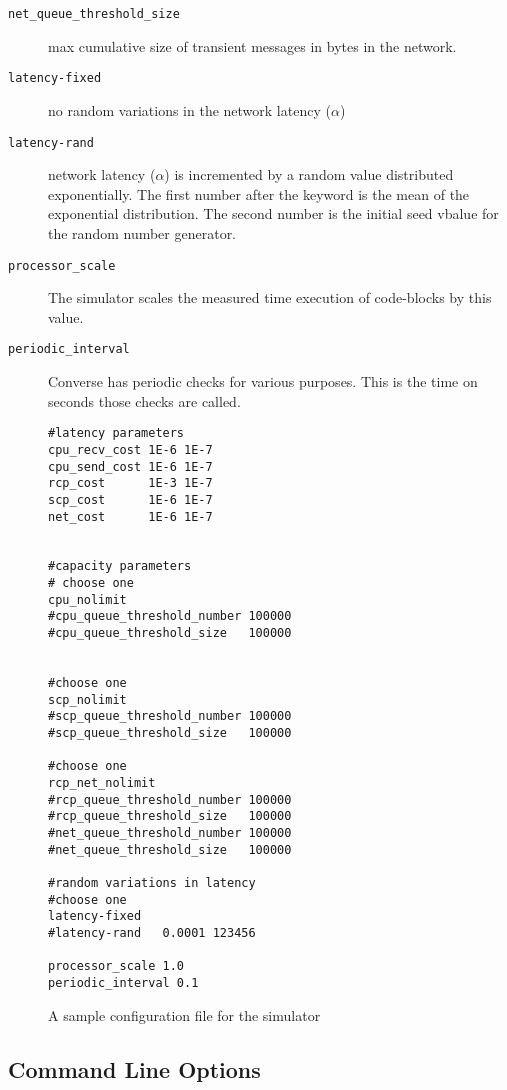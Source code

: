 \begin{description}
\item[{\tt net\_queue\_threshold\_size}] max cumulative size of transient 
                       messages in bytes in the network.

\item[{\tt latency-fixed}] no random variations in the network latency 
                           ($\alpha$)

\item[{\tt latency-rand}] network latency ($\alpha$) is incremented by
                       a random value distributed exponentially. The first
                       number after the keyword is the mean of the
                       exponential distribution. The second number is the
                       initial seed vbalue for the random number generator.


\item[{\tt processor\_scale}] The simulator scales the measured time
                      execution of code-blocks by this value.

\item[{\tt periodic\_interval}] Converse has periodic checks for
                      various purposes. This is the time on seconds
                      those checks are called.
\end{description}


\begin{figure}
\begin{verbatim}
#latency parameters
cpu_recv_cost 1E-6 1E-7              
cpu_send_cost 1E-6 1E-7
rcp_cost      1E-3 1E-7
scp_cost      1E-6 1E-7
net_cost      1E-6 1E-7


#capacity parameters
# choose one 
cpu_nolimit
#cpu_queue_threshold_number 100000
#cpu_queue_threshold_size   100000


#choose one
scp_nolimit
#scp_queue_threshold_number 100000
#scp_queue_threshold_size   100000

#choose one
rcp_net_nolimit
#rcp_queue_threshold_number 100000
#rcp_queue_threshold_size   100000
#net_queue_threshold_number 100000
#net_queue_threshold_size   100000

#random variations in latency
#choose one
latency-fixed
#latency-rand   0.0001 123456

processor_scale 1.0
periodic_interval 0.1
\end{verbatim}
\caption{A sample configuration file for the simulator}
\label{fig:simconfig}
\end{figure}

\subsection[Command Line Options]{Command Line Options}
\label{command line options}

